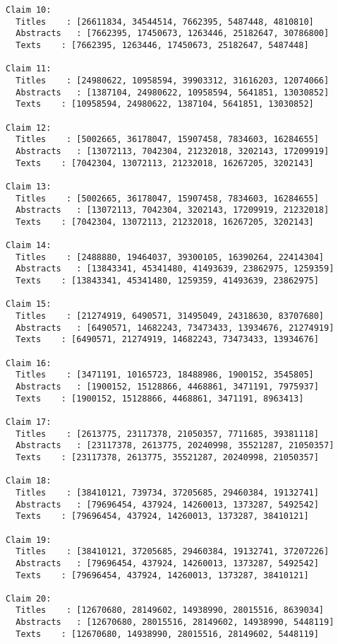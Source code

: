 \documentclass[11pt]{article}
\begin{document}
\begin{Verbatim}[commandchars=\\\{\}]
Claim 10:
  Titles    : [26611834, 34544514, 7662395, 5487448, 4810810]
  Abstracts   : [7662395, 17450673, 1263446, 25182647, 30786800]
  Texts    : [7662395, 1263446, 17450673, 25182647, 5487448]

Claim 11:
  Titles    : [24980622, 10958594, 39903312, 31616203, 12074066]
  Abstracts   : [1387104, 24980622, 10958594, 5641851, 13030852]
  Texts    : [10958594, 24980622, 1387104, 5641851, 13030852]

Claim 12:
  Titles    : [5002665, 36178047, 15907458, 7834603, 16284655]
  Abstracts   : [13072113, 7042304, 21232018, 3202143, 17209919]
  Texts    : [7042304, 13072113, 21232018, 16267205, 3202143]

Claim 13:
  Titles    : [5002665, 36178047, 15907458, 7834603, 16284655]
  Abstracts   : [13072113, 7042304, 3202143, 17209919, 21232018]
  Texts    : [7042304, 13072113, 21232018, 16267205, 3202143]

Claim 14:
  Titles    : [2488880, 19464037, 39300105, 16390264, 22414304]
  Abstracts   : [13843341, 45341480, 41493639, 23862975, 1259359]
  Texts    : [13843341, 45341480, 1259359, 41493639, 23862975]

Claim 15:
  Titles    : [21274919, 6490571, 31495049, 24318630, 83707680]
  Abstracts   : [6490571, 14682243, 73473433, 13934676, 21274919]
  Texts    : [6490571, 21274919, 14682243, 73473433, 13934676]

Claim 16:
  Titles    : [3471191, 10165723, 18488986, 1900152, 3545805]
  Abstracts   : [1900152, 15128866, 4468861, 3471191, 7975937]
  Texts    : [1900152, 15128866, 4468861, 3471191, 8963413]

Claim 17:
  Titles    : [2613775, 23117378, 21050357, 7711685, 39381118]
  Abstracts   : [23117378, 2613775, 20240998, 35521287, 21050357]
  Texts    : [23117378, 2613775, 35521287, 20240998, 21050357]

Claim 18:
  Titles    : [38410121, 739734, 37205685, 29460384, 19132741]
  Abstracts   : [79696454, 437924, 14260013, 1373287, 5492542]
  Texts    : [79696454, 437924, 14260013, 1373287, 38410121]

Claim 19:
  Titles    : [38410121, 37205685, 29460384, 19132741, 37207226]
  Abstracts   : [79696454, 437924, 14260013, 1373287, 5492542]
  Texts    : [79696454, 437924, 14260013, 1373287, 38410121]

Claim 20:
  Titles    : [12670680, 28149602, 14938990, 28015516, 8639034]
  Abstracts   : [12670680, 28015516, 28149602, 14938990, 5448119]
  Texts    : [12670680, 14938990, 28015516, 28149602, 5448119]


\end{Verbatim}
\end{document}
